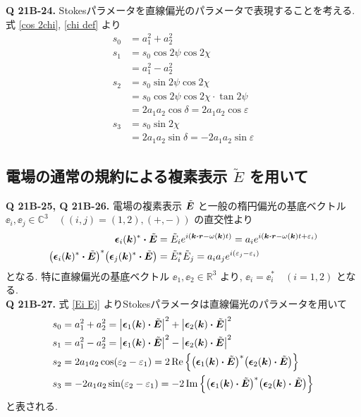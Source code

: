 \documentclass[uplatex,dvipdfmx,a4paper,11pt]{jlreq}
\newcommand{\CC}{\mathbb{C}}
\newcommand{\RR}{\mathbb{R}}
\newcommand{\rr}{\bm{r}}
\newcommand{\kk}{\bm{k}}
\theoremstyle{definition}
\begin{document}
\textbf{Q 21B-24.}
Stokesパラメータを直線偏光のパラメータで表現することを考える. 式 \eqref{cos 2chi}, \eqref{chi def} より
\begin{align}
  s_0 & = a_1^2 + a_2^2                               \\
  s_1 & = s_0\cos2\psi\cos2\chi                       \\
      & = a_1^2 - a_2^2                               \\
  s_2 & = s_0\sin2\psi\cos2\chi                       \\
      & = s_0\cos2\psi\cos2\chi\cdot\tan2\psi         \\
      & = 2a_1a_2\cos\delta = 2a_1a_2\cos\varepsilon  \\
  s_3 & = s_0\sin2\chi                                \\
      & = 2a_1a_2\sin\delta = -2a_1a_2\sin\varepsilon
\end{align}

\subsection{電場の通常の規約による複素表示 $\tilde{E}$ を用いて}
\textbf{Q 21B-25, Q 21B-26.}
電場の複素表示 $\tilde{\bm{E}}$ と一般の楕円偏光の基底ベクトル $\ee_i, \ee_j\in\CC^3\quad ((i, j) = (1, 2), (+, -))$ の直交性より
\begin{align}
  \ee_i(\kk)^*\vdot\ET
   & = \Et_ie^{\ii(\kk\vdot\rr - \omega(\kk)t)} = a_ie^{\ii(\kk\vdot\rr - \omega(\kk)t + \varepsilon_i)} \\
  \qty(\ee_i(\kk)^*\vdot\ET)^*\qty(\ee_j(\kk)^*\vdot\ET)
   & = \Et_i^*\Et_j = a_ia_je^{\ii(\varepsilon_j - \varepsilon_i)} \label{Ei Ej}
\end{align}
となる. 特に直線偏光の基底ベクトル $\ee_1, \ee_2\in\RR^3$ より, $\ee_i = \ee_i^*\quad(i=1,2)$ となる. \\

\textbf{Q 21B-27.}
式 \eqref{Ei Ej} よりStokesパラメータは直線偏光のパラメータを用いて
\begin{align}
  s_0 & = a_1^2 + a_2^2 = \qty|\ee_1(\kk)\vdot\ET|^2 + \qty|\ee_2(\kk)\vdot\ET|^2                                      \\
  s_1 & = a_1^2 - a_2^2 = \qty|\ee_1(\kk)\vdot\ET|^2 - \qty|\ee_2(\kk)\vdot\ET|^2                                      \\
  s_2 & = 2a_1a_2\cos(\varepsilon_2 - \varepsilon_1) = 2\Re\qty{\qty(\ee_1(\kk)\vdot\ET)^*\qty(\ee_2(\kk)\vdot\ET)}    \\
  s_3 & = - 2a_1a_2\sin(\varepsilon_2 - \varepsilon_1) = -2\Im\qty{\qty(\ee_1(\kk)\vdot\ET)^*\qty(\ee_2(\kk)\vdot\ET)}
\end{align}
と表される. \\
\end{document}
